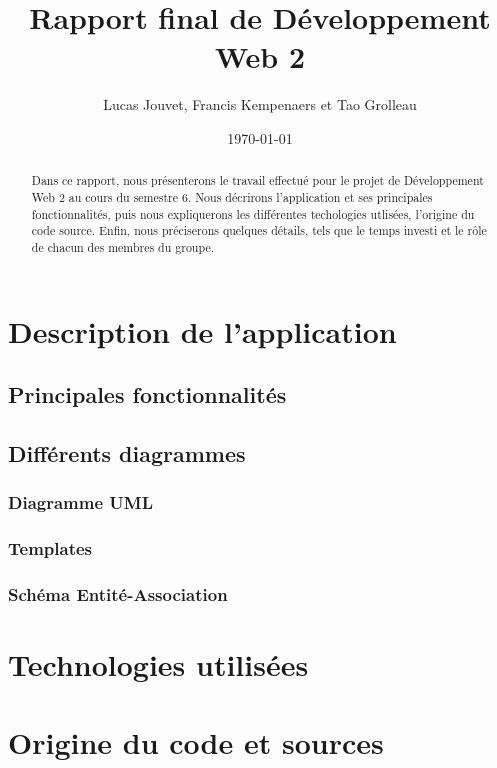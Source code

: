 \documentclass[a4paper, 12pt]{article}
\title{Rapport final de Développement Web 2}
\author{Lucas Jouvet, Francis Kempenaers et Tao Grolleau}
\date{\today}
\begin{document}
\maketitle

\begin{abstract}
  Dans ce rapport, nous présenterons le travail effectué pour le projet de Développement Web 2 au cours du semestre 6. Nous décrirons l'application et ses principales fonctionnalités, puis nous expliquerons les différentes techologies utlisées, l'origine du code source. Enfin, nous préciserons quelques détails, tels que le temps investi et le rôle de chacun des membres du groupe.
\end{abstract}

\newpage

\section{Description de l'application}

\subsection{Principales fonctionnalités}

\subsection{Différents diagrammes}

\subsubsection{Diagramme UML}

\subsubsection{Templates}

\subsubsection{Schéma Entité-Association}

\section{Technologies utilisées}

\section{Origine du code et sources}
\end{document}
